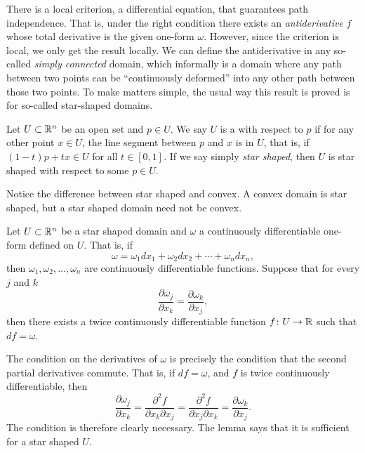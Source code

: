 There is a local criterion, a differential equation, that guarantees
path independence.  That is, under the right condition there exists
an \emph{antiderivative} $f$ whose total derivative is the given one-form
$\omega$.  However, since the criterion is local, we only get the result
locally.  We can define the antiderivative in any so-called
\emph{simply connected} domain, which informally is a domain where
any path between two points can be ``continuously deformed''
into any other path
between those two points.  To make matters simple, the usual way
this result is proved is for so-called star-shaped domains.

\begin{defn}
Let $U \subset {\mathbb{R}}^n$ be an open set and $p \in U$.  We say $U$ is
a \emph{}
with respect to $p$ if for any other point $x \in U$,
the line segment between $p$ and $x$ is in $U$, that is, if
$(1-t)p + tx \in U$ for all $t \in [0,1]$.
If we say simply \emph{star shaped}, then $U$ is star shaped with respect to
some $p \in U$.
\end{defn}

Notice the difference between star shaped and convex.  A convex domain is
star shaped, but a star shaped domain need not be convex.

\begin{thm}
Let $U \subset {\mathbb{R}}^n$ be a star shaped domain and $\omega$ a continuously
differentiable one-form defined on $U$.  That is, if
\begin{equation*}
\omega =
\omega_1 dx_1 +
\omega_2 dx_2 + \cdots +
\omega_n dx_n ,
\end{equation*}
then $\omega_1,\omega_2,\ldots,\omega_n$ are continuously differentiable
functions.  Suppose that for every $j$ and $k$
\begin{equation*}
\frac{\partial \omega_j}{\partial x_k} = \frac{\partial \omega_k}{\partial x_j} ,
\end{equation*}
then there exists a twice continuously differentiable function $f \colon U
\to {\mathbb{R}}$
such that $df = \omega$.
\end{thm}

The condition on the derivatives of $\omega$ is precisely the condition
that the second partial derivatives commute.  That is, if $df = \omega$,
and $f$ is twice continuously differentiable, then
\begin{equation*}
\frac{\partial \omega_j}{\partial x_k}
=
\frac{\partial^2 f}{\partial x_k \partial x_j} 
=
\frac{\partial^2 f}{\partial x_j \partial x_k} 
=
\frac{\partial \omega_k}{\partial x_j} .
\end{equation*}
The condition is therefore clearly necessary.  The lemma says that it is
sufficient for a star shaped $U$.

